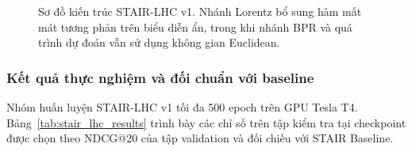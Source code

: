 \begin{figure}[!htbp]

    \caption{
        Sơ đồ kiến trúc STAIR-LHC v1.
        Nhánh Lorentz bổ sung hàm mất mát tương phản
        trên biểu diễn ẩn, trong khi nhánh BPR
        và quá trình dự đoán vẫn sử dụng
        không gian Euclidean.
    }

    \label{fig:stair_lhc_architecture}

\end{figure}



\subsubsection{Kết quả thực nghiệm và đối chuẩn với baseline}

Nhóm huấn luyện STAIR-LHC v1 tối đa 500 epoch trên GPU Tesla T4. Bảng~\ref{tab:stair_lhc_results} trình bày các chỉ số trên tập kiểm tra tại checkpoint được chọn theo NDCG@20 của tập validation và đối chiếu với STAIR Baseline.

